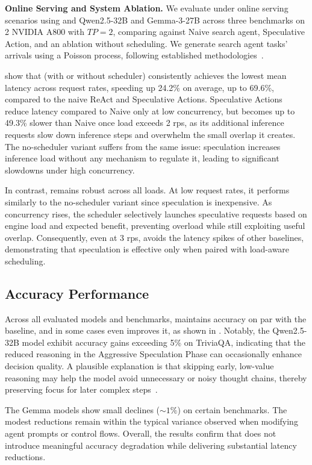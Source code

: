 \noindent
\textbf{Online Serving and System Ablation.}
We evaluate \system under online serving scenarios using and Qwen2.5-32B and Gemma-3-27B across three benchmarks on 2 NVIDIA A800 with $TP=2$, comparing against Naive search agent, Speculative Action, and an ablation without scheduling.
We generate search agent tasks' arrivals using a Poisson process, following established methodologies~\cite{vllm,fastserve}.

 show that \system (with or without scheduler) consistently achieves the lowest mean latency across request rates, speeding up 24.2\% on average, up to 69.6\%, compared to the naive ReAct and Speculative Actions.
Speculative Actions reduce latency compared to Naive only at low concurrency, but becomes up to 49.3\% slower than Naive once load exceeds 2 rps, as its additional inference requests slow down inference steps and overwhelm the small overlap it creates.
The no-scheduler variant suffers from the same issue: speculation increases inference load without any mechanism to regulate it, leading to significant slowdowns under high concurrency.

In contrast, \system remains robust across all loads.
At low request rates, it performs similarly to the no-scheduler variant since speculation is inexpensive. 
As concurrency rises, the scheduler selectively launches speculative requests based on engine load and expected benefit, preventing overload while still exploiting useful overlap. 
Consequently, even at 3 rps, \system avoids the latency spikes of other baselines, demonstrating that speculation is effective only when paired with load-aware scheduling.

\subsection{Accuracy Performance}

Across all evaluated models and benchmarks, \system maintains accuracy on par with the baseline, and in some cases even improves it, as shown in .
Notably, the Qwen2.5-32B model exhibit accuracy gains exceeding 5\% on TriviaQA, indicating that the reduced reasoning in the Aggressive Speculation Phase can occasionally enhance decision quality.
A plausible explanation is that skipping early, low-value reasoning may help the model avoid unnecessary or noisy thought chains, thereby preserving focus for later complex steps~\cite{dangeroverthinking,dontoverthinkit,adaptthink}.

The Gemma models show small declines ($\sim 1\%$) on certain benchmarks. 
The modest reductions remain within the typical variance observed when modifying agent prompts or control flows. 
Overall, the results confirm that \system does not introduce meaningful accuracy degradation while delivering substantial latency reductions.

